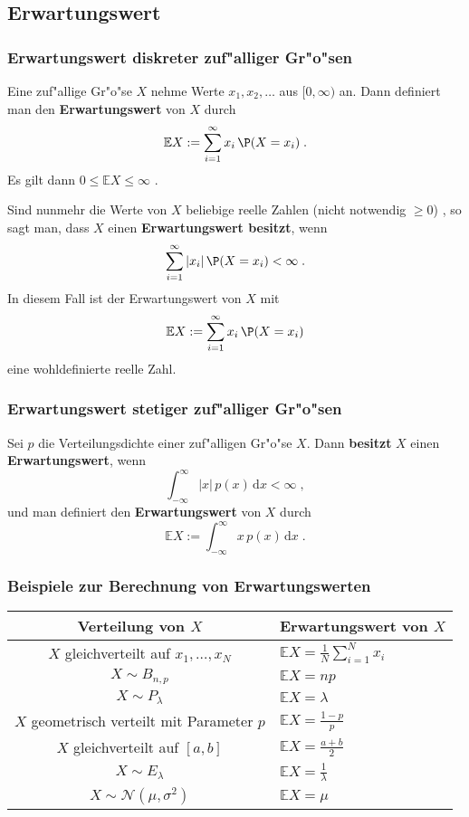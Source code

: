 \documentclass[ngerman,draft,parskip=half,twoside]{scrartcl}
\newcommand*{\E}{\mathbb{E}}        %
\begin{document}
\subsection{Erwartungswert}
\subsubsection{Erwartungswert diskreter zuf"alliger Gr"o"sen}
Eine zuf"allige Gr"o"se $X$ nehme Werte $x_1,x_2,\ldots$ aus $[0,\infty)$ an. Dann
definiert man den \textbf{Erwartungswert} von $X$ durch
$$
\E X :=\sum_{i=1}^\infty x_i\,\P(X=x_i)\;.
$$
Es gilt dann $0\le \E X \le \infty$ .

Sind nunmehr die Werte von $X$ beliebige reelle Zahlen (nicht notwendig $\ge 0$)
, so sagt man, dass $X$ einen \textbf{Erwartungswert
besitzt}, wenn
$$
\sum_{i=1}^\infty |x_i|\,\P(X=x_i)<\infty\;.
$$
In diesem Fall ist der Erwartungswert von $X$ mit
$$
\E X :=\sum_{i=1}^\infty x_i\,\P(X=x_i)
$$
eine wohldefinierte reelle Zahl.

\subsubsection{Erwartungswert stetiger zuf"alliger Gr"o"sen}
Sei $p$ die Verteilungsdichte einer zuf"alligen Gr"o"se $X$. Dann \textbf{besitzt} $X$ einen
\textbf{Erwartungswert}, wenn
$$
\int_{-\infty}^\infty |x|\,p(x)\,\mathrm   d x <\infty\;,
$$
und man definiert den \textbf{Erwartungswert} von $X$ durch
$$
\E X := \int_{-\infty}^\infty x \,p(x)\,\mathrm   d x\;.
$$
\subsubsection{Beispiele zur Berechnung von Erwartungswerten}
\medskip

{\renewcommand{\arraystretch}{1.4}
\begin{center}
\begin{tabular}{|c|l|}\hline
\bf Verteilung von $X$& \bf Erwartungswert von $X$\\ \hline\hline
$X$ gleichverteilt auf $x_1,\ldots,x_N$& $\E X=\frac{1}{N}\sum_{i=1}^N x_i$\\ \hline
$X\sim B_{n,p}$& $\E X= n p$\\ \hline
$X\sim P_\lambda$&$\E X= \lambda$\\ \hline
$X$ geometrisch verteilt mit Parameter $p$& $\E X = \frac{1-p}{p}$\\ \hline
$X$ gleichverteilt auf $[a,b]$& $\E X= \frac{a+b}{2}$\\ \hline
$X\sim E_\lambda$& $\E X = \frac{1}{\lambda}$\\ \hline
$X\sim \mathcal N(\mu,\sigma^2)$&$ \E X = \mu$\\ \hline
\end{tabular}
\end{center}
}
\end{document}
